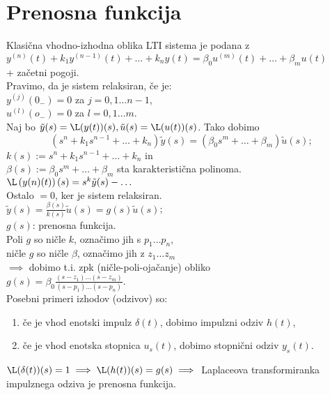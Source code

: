 \documentclass[a4paper, 12pt]{book}
\theoremstyle{definition}
\theoremstyle{remark}
\begin{document}
\section{Prenosna funkcija}

Klasična vhodno-izhodna oblika LTI sistema je podana z \\
$y^{(n)}(t) + k_1 y^{(n-1)}(t) + \dots + k_n y(t) = \beta_0 u^{(m)}(t) + \dots + \beta_m u(t)$ \\
+ začetni pogoji. \\
Pravimo, da je sistem relaksiran, če je: \\
$y^{(j)}(0_-) = 0$ za $j = 0, 1 \dots n-1$, \\
$u^{(l)}(o_-) = 0$ za $l = 0, 1 \dots m$. \\
Naj bo $\tilde{y}(s) = \L(y(t))(s), \tilde{u}(s) = \L(u(t))(s)$.
Tako dobimo
\begin{equation*}
    \left(s^n + k_1 s^{n-1} + \dots + k_n\right) \tilde{y}(s) =
    \left(\beta_0 s^m + \dots + \beta_m\right) \tilde{u}(s);
\end{equation*}
$k(s) := s^n + k_1 s^{n-1} + \dots + k_n$ in \\
$\beta(s) := \beta_0 s^m + \dots + \beta_m$ sta karakteristična polinoma. \\
$\L\left(y{(n)}(t)\right)(s) = s^k \tilde{y}(s) - \dots$ \\
Ostalo $= 0$, ker je sistem relaksiran. \\
$\tilde{y}(s) = \frac{\beta(s)}{k(s)} \tilde{u}(s) = g(s) \tilde{u}(s)$; \\
$g(s)$: prenosna funkcija. \\
Poli $g$ so ničle $k$, označimo jih s $p_1 \dots p_n$, \\
ničle $g$ so ničle $\beta$, označimo jih z $z_1 \dots z_m$ \\
$\implies$ dobimo t.i. zpk (ničle-poli-ojačanje) obliko \\
$g(s) = \beta_0 \frac{(s-z_1) \dots (s-z_m)}{(s-p_1) \dots (s-p_n)}$. \\
Posebni primeri izhodov (odzivov) so:
\begin{enumerate}[label=\alph*)]
    \item če je vhod enotski impulz $\delta(t)$, dobimo impulzni odziv $h(t)$,
    \item če je vhod enotska stopnica $u_s(t)$, dobimo stopnični odziv $y_s(t)$.
\end{enumerate}
$\L(\delta(t))(s) = 1 \implies \L(h(t))(s) = g(s) \implies$
Laplaceova transformiranka impulznega odziva je prenosna funkcija. \\
\end{document}
